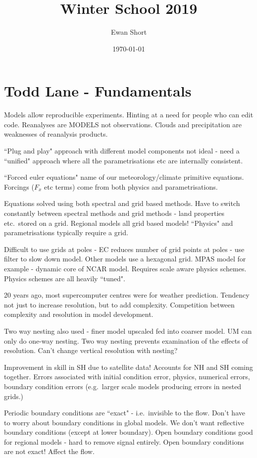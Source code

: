 \documentclass[12pt]{article}
\title{Winter School 2019}
\author{Ewan Short}
\date{\today}
\begin{document}
\maketitle

\section{Todd Lane - Fundamentals}
Models allow reproducible experiments. Hinting at a need for people who can edit code. Reanalyses are MODELS not observations. Clouds and precipitation are weaknesses of reanalysis products. 

``Plug and play" approach with different model components not ideal - need a ``unified" approach where all the parametrisations etc are internally consistent. 

``Forced euler equations" name of our meteorology/climate primitive equations. Forcings ($F_x$ etc terms) come from both physics and parametrisations. 

Equations solved using both spectral and grid based methods. Have to switch constantly between spectral methods and grid methods - land properties etc.~stored on a grid. Regional models all grid based models! ``Physics" and parametrisations typically require a grid. 

Difficult to use grids at poles - EC reduces number of grid points at poles - use filter to slow down model. Other models use a hexagonal grid. MPAS model for example - dynamic core of NCAR model. Requires scale aware physics schemes. Physics schemes are all heavily ``tuned". 

20 years ago, most supercomputer centres were for weather prediction. Tendency not just to increase resolution, but to add complexity. Competition between complexity and resolution in model development. 

Two way nesting also used - finer model upscaled fed into coarser model. UM can only do one-way nesting. Two way nesting prevents examination of the effects of resolution. Can't change vertical resolution with nesting? 

Improvement in skill in SH due to satellite data! Accounts for NH and SH coming together. Errors associated with initial condition error, physics, numerical errors, boundary condition errors (e.g.~larger scale models producing errors in nested grids.)

Periodic boundary conditions are ``exact" - i.e.~invisible to the flow. Don't have to worry about boundary conditions in global models. We don't want reflective boundary conditions (except at lower boundary). Open boundary conditions good for regional models - hard to remove signal entirely. Open boundary conditions are not exact! Affect the flow.
\end{document}
